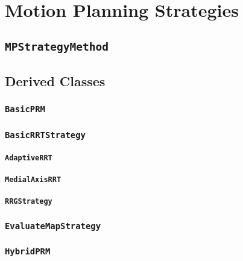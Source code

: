 \chapter{Motion Planning Strategies}

\section{\texttt{MPStrategyMethod}}

\section{Derived Classes}

\subsection{\texttt{BasicPRM}}

\subsection{\texttt{BasicRRTStrategy}}

\subsubsection{\texttt{AdaptiveRRT}}

\subsubsection{\texttt{MedialAxisRRT}}

\subsubsection{\texttt{RRGStrategy}}

\subsection{\texttt{EvaluateMapStrategy}}

\subsection{\texttt{HybridPRM}}

